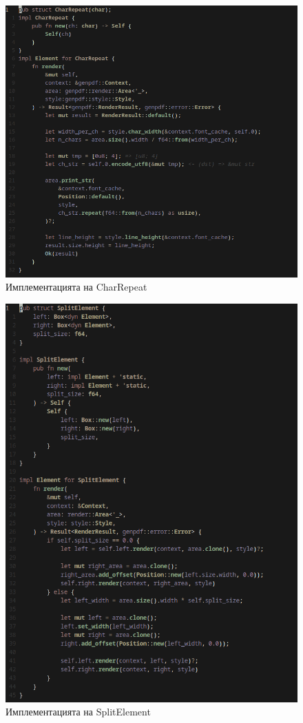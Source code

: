 \documentclass[12pt]{article}
\begin{document}
\begin{figure}[!htb]
  \includegraphics[scale=0.60]{genpdf-charrepeat.png}
  \centering
  \caption{Имплементацията на CharRepeat}
  \label{fig:genpdf-charrepeat}
\end{figure}

\begin{figure}[!htb]
  \includegraphics[scale=0.60]{genpdf-split.png}
  \centering
  \caption{Имплементацията на SplitElement}
  \label{fig:genpdf-split}
\end{figure}
\end{document}
